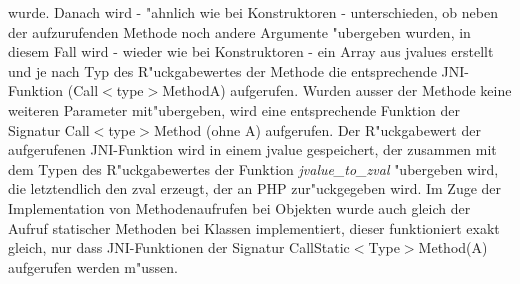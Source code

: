 wurde. Danach wird - "ahnlich wie bei Konstruktoren - unterschieden, ob neben der aufzurufenden Methode noch andere Argumente "ubergeben wurden, in diesem
Fall wird - wieder wie bei Konstruktoren - ein Array aus jvalues erstellt und je nach Typ des R"uckgabewertes der Methode die entsprechende JNI-Funktion
(Call$<$type$>$MethodA) aufgerufen. Wurden ausser der Methode keine weiteren Parameter mit"ubergeben, wird eine entsprechende Funktion der Signatur
Call$<$type$>$Method (ohne A) aufgerufen. Der R"uckgabewert der aufgerufenen JNI-Funktion wird in einem jvalue gespeichert, der zusammen mit dem
Typen des R"uckgabewertes der Funktion \emph{jvalue\_to\_zval} "ubergeben wird, die letztendlich den zval erzeugt, der an PHP zur"uckgegeben wird.
Im Zuge der Implementation von Methodenaufrufen bei Objekten wurde auch gleich der Aufruf statischer Methoden bei Klassen implementiert, dieser funktioniert exakt 
gleich, nur dass JNI-Funktionen der Signatur CallStatic$<$Type$>$Method(A) aufgerufen werden m"ussen.

